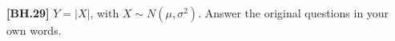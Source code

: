 \begin{exercise}
	\textbf{[BH.29]}  $Y=|X|$, with $X \sim  {N}\left(\mu, \sigma^2\right)$. Answer the original questions in your own words.
\end{exercise}
